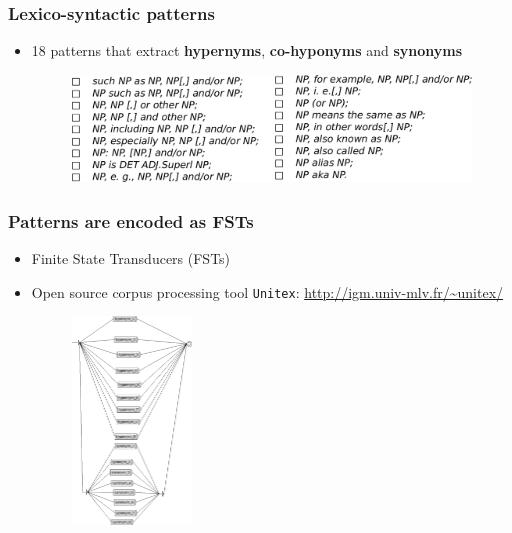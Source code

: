\begin{frame}
\frametitle{Lexico-syntactic patterns}

\begin{itemize}
  \item 18 patterns that extract \textbf{hypernyms}, \textbf{co-hyponyms} and \textbf{synonyms}
\begin{figure}  
    \centering
        \includegraphics[width=1.0\textwidth]{figures/patterns}
    \end{figure}
\end{itemize}

\end{frame}




\begin{frame}
\frametitle{Patterns are encoded as FSTs}

\begin{itemize}
  \item Finite State Transducers (FSTs)
  \item Open source corpus processing tool \texttt{Unitex}: \url{http://igm.univ-mlv.fr/~unitex/}
  
\begin{figure}  
    \centering
        \includegraphics[width=0.3\textwidth]{figures/main-graph}
    \end{figure}
\end{itemize}

\end{frame}



